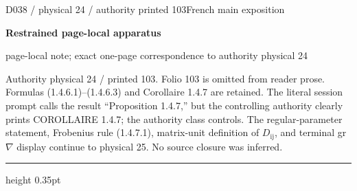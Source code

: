 \documentclass[9pt]{article}
\newcommand{\CanonText}[1]{\par{\fontsize{8.0}{9.35}\selectfont\RaggedRight #1\par}\vspace{2.2pt}}
\newcommand{\LayerTitle}{Restrained page-local apparatus}
\begin{document}
\noindent\begin{minipage}[t][\dimexpr\textheight-5pt\relax][t]{\textwidth}
{\sffamily\fontsize{7.3}{8.2}\selectfont\color{Quiet} D038 / physical 24 / authority printed 103\hfill French main exposition}
\par{}\vspace{4.5pt}
{\sffamily\fontsize{10.4}{11.6}\selectfont\bfseries\color{Accent} \LayerTitle}
\par{\sffamily\fontsize{6.7}{7.7}\selectfont\color{Quiet} page-local note; exact one-page correspondence to authority physical 24}
\vspace{5pt}
\CanonText{Authority physical 24 / printed 103. Folio 103 is omitted from reader prose. Formulas (1.4.6.1)–(1.4.6.3) and Corollaire 1.4.7 are retained. The literal session prompt calls the result “Proposition 1.4.7,” but the controlling authority clearly prints COROLLAIRE 1.4.7; the authority class controls. The regular-parameter statement, Frobenius rule (1.4.7.1), matrix-unit definition of \(D_{\mathrm{ij}}\), and terminal gr \(\nabla{}\) display continue to physical 25. No source closure was inferred.}
\vfill
{\color{Accent}\hrule height 0.35pt}\vspace{3pt}
\end{minipage}
\newpage
\end{document}
